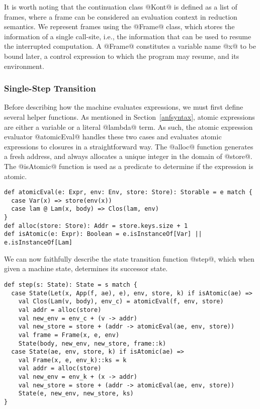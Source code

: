 \documentclass[acmsmall,review,anonymous]{acmart}\settopmatter{printfolios=true,printccs=false,printacmref=false}
\begin{document}
It is worth noting that the continuation class @Kont@ is defined as a list of
frames, where a frame can be considered an evaluation context in reduction semantics.
We represent frames using the @Frame@ class, which stores the information of a single
call-site, i.e., the information that can be used to resume the interrupted computation.
A @Frame@ constitutes a variable name @x@ to be bound later, a control expression
to which the program may resume, and its environment. 

\subsubsection{Single-Step Transition}
Before describing how the machine evaluates expressions, we must first define several helper
functions. As mentioned in Section~\ref{anfsyntax}, atomic expressions are either a variable
or a literal @lambda@ term. As such, the atomic expression evaluator @atomicEval@ handles
these two cases and evaluates atomic expressions to closures in a straightforward way.
The @alloc@ function generates a fresh address, and always allocates a unique integer
in the domain of @store@.
The @isAtomic@ function is used as a predicate to determine if the expression is atomic.

\begin{lstlisting}
def atomicEval(e: Expr, env: Env, store: Store): Storable = e match {
  case Var(x) => store(env(x))
  case lam @ Lam(x, body) => Clos(lam, env)
}
def alloc(store: Store): Addr = store.keys.size + 1
def isAtomic(e: Expr): Boolean = e.isInstanceOf[Var] || e.isInstanceOf[Lam]
\end{lstlisting}

We can now faithfully describe the state transition function @step@,
which when given a machine state, determines its successor state.

\begin{lstlisting}
def step(s: State): State = s match {
  case State(Let(x, App(f, ae), e), env, store, k) if isAtomic(ae) =>
    val Clos(Lam(v, body), env_c) = atomicEval(f, env, store)
    val addr = alloc(store)
    val new_env = env_c + (v -> addr)
    val new_store = store + (addr -> atomicEval(ae, env, store))
    val frame = Frame(x, e, env)
    State(body, new_env, new_store, frame::k)
  case State(ae, env, store, k) if isAtomic(ae) =>
    val Frame(x, e, env_k)::ks = k
    val addr = alloc(store)
    val new_env = env_k + (x -> addr)
    val new_store = store + (addr -> atomicEval(ae, env, store))
    State(e, new_env, new_store, ks)
}
\end{lstlisting}
\end{document}
